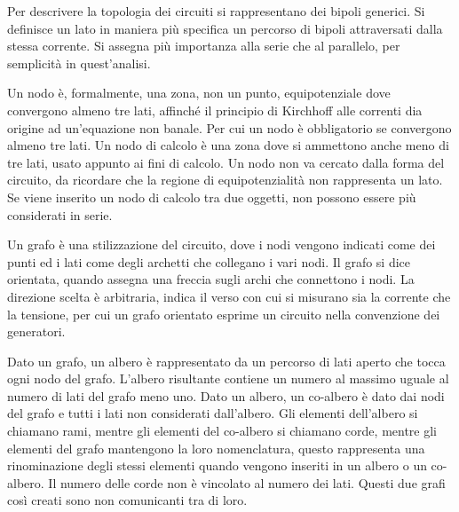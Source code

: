 \documentclass{article}
\numberwithin{equation}{subsection}
\begin{document}
Per descrivere la topologia dei circuiti si rappresentano dei bipoli generici. Si definisce un lato in maniera più specifica un percorso di bipoli attraversati dalla 
stessa corrente. Si assegna più importanza alla serie che al parallelo, per semplicità in quest'analisi. 

Un nodo è, formalmente, una zona, non un punto, equipotenziale dove convergono almeno tre lati, affinché il principio di Kirchhoff alle correnti dia origine ad un'equazione 
non banale. Per cui un nodo è obbligatorio se convergono almeno tre lati. Un nodo di calcolo è una zona dove si ammettono anche meno di tre lati, usato appunto ai fini di 
calcolo. Un nodo non va cercato dalla forma del circuito, da ricordare che la regione di equipotenzialità non rappresenta un lato. Se viene inserito un nodo di calcolo tra due 
oggetti, non possono essere più considerati in serie. 



Un grafo è una stilizzazione del circuito, dove i nodi vengono indicati come dei punti ed i lati come degli archetti che collegano i vari nodi. Il grafo si dice orientata, 
quando assegna una freccia sugli archi che connettono i nodi. La direzione scelta è arbitraria, indica il verso con cui si misurano sia la corrente che la tensione, per cui 
un grafo orientato esprime un circuito nella convenzione dei generatori.  



Dato un grafo, un albero è rappresentato da un percorso di lati aperto che tocca ogni nodo del grafo. L'albero risultante contiene un numero al massimo uguale al numero di lati 
del grafo meno uno. Dato un albero, un co-albero è dato dai nodi del grafo e tutti i lati non considerati dall'albero. Gli elementi dell'albero si chiamano rami, mentre gli 
elementi del co-albero si chiamano corde, mentre gli elementi del grafo mantengono la loro nomenclatura, questo rappresenta una rinominazione degli stessi elementi quando 
vengono inseriti in un albero o un co-albero. Il numero delle corde non è vincolato al numero dei lati. Questi due grafi così creati sono non comunicanti tra di loro. 
\end{document}
